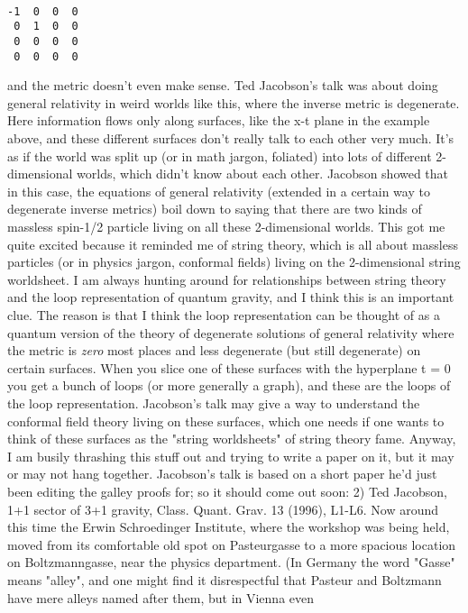 \begin{verbatim}

-1  0  0  0
 0  1  0  0
 0  0  0  0
 0  0  0  0
\end{verbatim}
    
and the metric doesn't even make sense.
Ted Jacobson's talk was about doing general relativity in weird
worlds like this, where the inverse metric is degenerate.  Here
information flows only along surfaces, like the x-t plane in the
example above, and these different surfaces don't really talk to
each other very much.  It's as if the world was split up (or in
math jargon, foliated) into lots of different 2-dimensional
worlds, which didn't know about each other.  Jacobson showed that
in this case, the equations of general relativity (extended in a
certain way to degenerate inverse metrics) boil down to saying
that there are two kinds of massless spin-1/2 particle living on
all these 2-dimensional worlds.  
This got me quite excited because it reminded me of string
theory, which is all about massless particles (or in physics
jargon, conformal fields) living on the 2-dimensional string
worldsheet.   I am always hunting around for relationships
between string theory and the loop representation of quantum
gravity, and I think this is an important clue.  The reason is
that I think the loop representation can be thought of as a
quantum version of the theory of degenerate solutions of general
relativity where the metric is \emph{zero} most places and less
degenerate (but still degenerate) on certain surfaces.   When you
slice one of these surfaces with the hyperplane t = 0 you get a
bunch of loops (or more generally a graph), and these are the
loops of the loop representation.  Jacobson's talk may give a way
to understand the conformal field theory living on these
surfaces, which one needs if one wants to think of these surfaces
as the "string worldsheets" of string theory fame.  Anyway, I am
busily thrashing this stuff out and trying to write a paper on
it, but it may or may not hang together.
Jacobson's talk is based on a short paper he'd just been editing
the galley proofs for; so it should come out soon: 
2) Ted Jacobson, 1+1 sector of 3+1 gravity, Class. Quant. Grav.
13 (1996), L1-L6.
Now around this time the Erwin Schroedinger Institute, where the
workshop was being held, moved from its comfortable old spot on
Pasteurgasse to a more spacious location on Boltzmanngasse, near
the physics department.  (In Germany the word "Gasse" means
"alley", and one might find it disrespectful that Pasteur and
Boltzmann have mere alleys named after them, but in Vienna even
